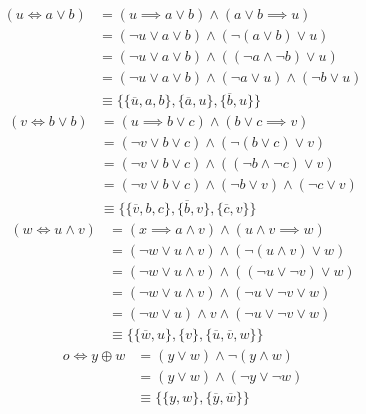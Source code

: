 \documentclass{scrartcl}
\newcommand*\xor{\mathbin{\oplus}}
\begin{document}
\begin{itemize}
	\begin{equation}
		\begin{split}
			(u \iff a \vee b) &= (u \implies a \vee b) \wedge (a \vee b \implies u) \\
			&= (\neg u \vee a \vee b) \wedge (\neg (a \vee b) \vee u) \\
			&= (\neg u \vee a \vee b) \wedge ((\neg a \wedge \neg b) \vee u) \\
			&= (\neg u \vee a \vee b) \wedge (\neg a \vee u) \wedge (\neg b \vee u) \\
			&\equiv \{ \{ \overline{u},a,b \},\{ \overline{a},u \},\{ \overline{b},u \} \}
		\end{split}
	\end{equation}
	\begin{equation}
		\begin{split}
			(v \iff b \vee b) &= (u \implies b \vee c) \wedge (b \vee c \implies v) \\
			&= (\neg v \vee b \vee c) \wedge (\neg (b \vee c) \vee v) \\
			&= (\neg v \vee b \vee c) \wedge ((\neg b \wedge \neg c) \vee v) \\
			&= (\neg v \vee b \vee c) \wedge (\neg b \vee v) \wedge (\neg c \vee v) \\
			&\equiv \{ \{ \overline{v},b,c \},\{ \overline{b},v \},\{ \overline{c},v \} \}
		\end{split}
	\end{equation}
	\begin{equation}
		\begin{split}
			(w \iff u \wedge v) &= (x \implies a \wedge v) \wedge (u \wedge v \implies w) \\
			&= (\neg w \vee u \wedge v) \wedge (\neg (u \wedge v) \vee w) \\
			&= (\neg w \vee u \wedge v) \wedge ((\neg u \vee \neg v) \vee w) \\
			&= (\neg w \vee u \wedge v) \wedge (\neg u \vee \neg v \vee w) \\
			&= (\neg w \vee u) \wedge v \wedge (\neg u \vee \neg v \vee w) \\
			&\equiv \{ \{ \overline{w},u \},\{ v \},\{ \overline{u},\overline{v},w \} \}
		\end{split}
	\end{equation}
	\begin{equation}
		\begin{split}
			o \iff y \xor w &= (y \vee w) \wedge \neg (y \wedge w) \\
			&= (y \vee w) \wedge (\neg y \vee \neg w) \\
			&\equiv \{ \{ y,w \},\{ \overline{y},\overline{w} \} \}
		\end{split}
	\end{equation}
\end{itemize}
\end{document}
